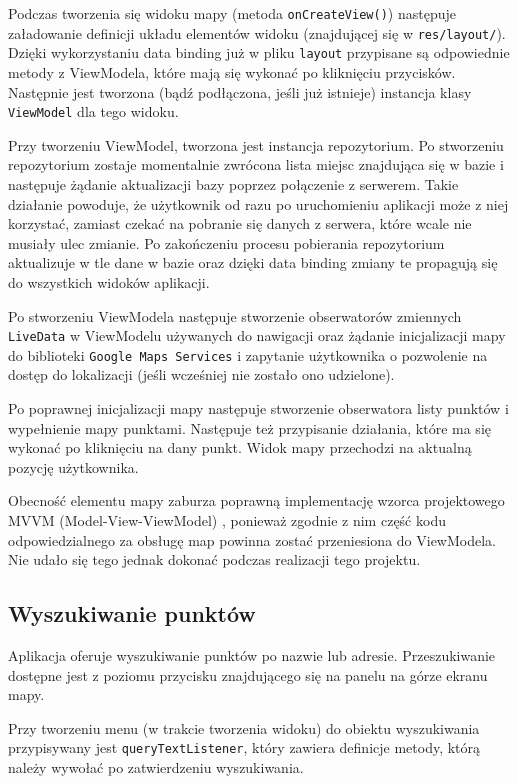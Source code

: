 \documentclass[polish,polish,a4paper,12pt]{article}
\begin{document}
	Podczas tworzenia się widoku mapy (metoda \texttt{onCreateView()}) następuje załadowanie definicji układu elementów widoku (znajdującej się w \texttt{res/layout/}). Dzięki wykorzystaniu data binding już w pliku \texttt{layout} przypisane są odpowiednie metody z ViewModela, które mają się wykonać po kliknięciu przycisków. Następnie jest tworzona (bądź podłączona, jeśli już istnieje) instancja klasy \texttt{ViewModel} dla tego widoku.

	Przy tworzeniu ViewModel, tworzona jest instancja repozytorium. Po stworzeniu repozytorium zostaje momentalnie zwrócona lista miejsc znajdująca się w bazie i następuje żądanie aktualizacji bazy poprzez połączenie z serwerem. Takie działanie powoduje, że użytkownik od razu po uruchomieniu aplikacji może z niej korzystać, zamiast czekać na pobranie się danych z serwera, które wcale nie musiały ulec zmianie. Po zakończeniu procesu pobierania repozytorium aktualizuje w tle dane w bazie oraz dzięki data binding zmiany te propagują się do wszystkich widoków aplikacji.

	Po stworzeniu ViewModela następuje stworzenie obserwatorów zmiennych \texttt{LiveData} w ViewModelu używanych do nawigacji oraz żądanie inicjalizacji mapy do biblioteki \texttt{Google Maps Services} i zapytanie użytkownika o pozwolenie na dostęp do lokalizacji (jeśli wcześniej nie zostało ono udzielone).

	Po poprawnej inicjalizacji mapy następuje stworzenie obserwatora listy punktów i wypełnienie mapy punktami. Następuje też przypisanie działania, które ma się wykonać po kliknięciu na dany punkt. Widok mapy przechodzi na aktualną pozycję użytkownika.

	Obecność elementu mapy zaburza poprawną implementację wzorca projektowego MVVM (Model-View-ViewModel) \cite{mvvmwiki}, ponieważ zgodnie z nim część kodu odpowiedzialnego za obsługę map powinna zostać przeniesiona do ViewModela. Nie udało się tego jednak dokonać podczas realizacji tego projektu.

	\subsection{Wyszukiwanie punktów}

	Aplikacja oferuje wyszukiwanie punktów po nazwie lub adresie. Przeszukiwanie dostępne jest z poziomu przycisku znajdującego się na panelu na górze ekranu mapy.

	Przy tworzeniu menu (w trakcie tworzenia widoku) do obiektu wyszukiwania przypisywany jest \texttt{queryTextListener}, który zawiera definicje metody, którą należy wywołać po zatwierdzeniu wyszukiwania.
\end{document}
